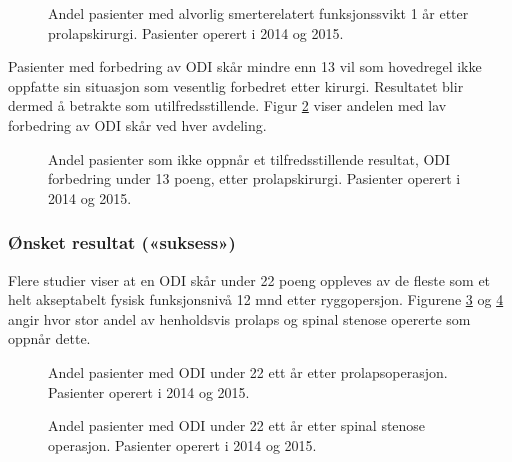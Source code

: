 \begin{figure}[ht]
\caption{\label{fig:Osw48}  Andel pasienter med alvorlig smerterelatert funksjonssvikt 1 år etter
prolapskirurgi. Pasienter operert i 2014 og 2015.}
\end{figure}



Pasienter med forbedring av ODI skår mindre enn 13 vil som hovedregel ikke
oppfatte sin situasjon som vesentlig forbedret etter kirurgi. Resultatet blir dermed å
betrakte som utilfredsstillende. Figur \ref{fig:OswEndrLav} viser andelen med lav forbedring av ODI skår ved hver avdeling.

\begin{figure}[ht]
\caption{\label{fig:OswEndrLav}   Andel pasienter som ikke oppnår et tilfredsstillende resultat, ODI
forbedring under 13 poeng, etter prolapskirurgi. Pasienter operert i 2014 og 2015.}
\end{figure}




















\subsubsection{Ønsket resultat («suksess»)}
Flere studier viser at en ODI skår  under 22 poeng oppleves av de fleste som et helt akseptabelt fysisk funksjonsnivå 12 mnd etter ryggopersjon. Figurene \ref{fig:Osw22Pro} og \ref{fig:Osw22SS} angir hvor stor andel av henholdsvis prolaps og spinal stenose opererte som oppnår dette.

\begin{figure}[ht]
\caption{\label{fig:Osw22Pro}   Andel pasienter med ODI under 22 ett år
etter prolapsoperasjon. Pasienter operert i 2014 og 2015.}
\end{figure}

\begin{figure}[ht]
\caption{\label{fig:Osw22SS}   Andel pasienter med ODI under 22 ett år
etter spinal stenose operasjon. Pasienter operert i 2014 og 2015.}
\end{figure}



